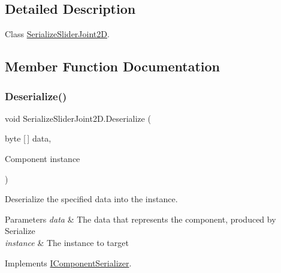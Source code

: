 \subsection{Detailed Description}
Class \hyperlink{class_serialize_slider_joint2_d}{Serialize\+Slider\+Joint2D}. 



\subsection{Member Function Documentation}
\mbox{\label{class_serialize_slider_joint2_d_a50d76e3724e23d0acc752f75715be6e8}} 
\subsubsection{\texorpdfstring{Deserialize()}{Deserialize()}}
{\footnotesize\ttfamily void Serialize\+Slider\+Joint2\+D.\+Deserialize (\begin{DoxyParamCaption}\item[{byte \mbox{[}$\,$\mbox{]}}]{data,  }\item[{Component}]{instance }\end{DoxyParamCaption})\hspace{0.3cm}{\ttfamily [inline]}}



Deserialize the specified data into the instance. 


\begin{DoxyParams}{Parameters}
{\em data} & The data that represents the component, produced by Serialize\\
\hline
{\em instance} & The instance to target\\
\hline
\end{DoxyParams}


Implements \hyperlink{interface_i_component_serializer_a4cc366a5c78b33d47a90c209d8fed883}{I\+Component\+Serializer}.

\mbox{\label{class_serialize_slider_joint2_d_ad690d87ffc29815b59900bde784a1ed3}} 
